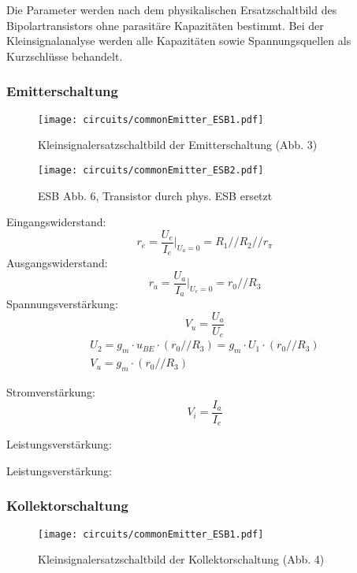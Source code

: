Die Parameter werden nach dem physikalischen Ersatzschaltbild des
Bipolartransistors ohne parasitäre Kapazitäten bestimmt. Bei der
Kleinsignalanalyse werden alle Kapazitäten sowie Spannungsquellen als
Kurzschlüsse behandelt.

\subsubsection{Emitterschaltung}

\begin{figure}[H]
  \begin{center}
    \texttt{[image: circuits/commonEmitter\_ESB1.pdf]}
  \end{center}
  \caption{Kleinsignalersatzschaltbild der Emitterschaltung (Abb. 3)}
\end{figure}

\begin{figure}[H]
  \begin{center}
    \texttt{[image: circuits/commonEmitter\_ESB2.pdf]}
  \end{center}
  \caption{ESB Abb. 6, Transistor durch phys. ESB ersetzt}
\end{figure}

\noindent Eingangswiderstand:
\[r_e = \frac{U_e}{I_e}|_{U_a = 0} = R_1 // R_2 // r_\pi\]
\noindent Ausgangswiderstand:
\[r_a = \frac{U_a}{I_a}|_{U_e = 0} = r_0 // R_3 \]
\noindent Spannungsverstärkung:
\[V_u = \frac{U_a}{U_e}\]
\begin{gather*}
  U_2 = g_m \cdot u_{BE} \cdot (r_0 // R_3) = g_m \cdot U_1 \cdot (r_0 // R_3)\\
  V_u = g_m \cdot (r_0 // R_3)
\end{gather*}

\noindent Stromverstärkung:
\[V_i = \frac{I_a}{I_e}\]
\[\]

\noindent Leistungsverstärkung:

\noindent Leistungsverstärkung:

\subsubsection{Kollektorschaltung}
\begin{figure}[H]
  \begin{center}
    \texttt{[image: circuits/commonEmitter\_ESB1.pdf]}
  \end{center}
  \caption{Kleinsignalersatzschaltbild der Kollektorschaltung (Abb. 4)}
\end{figure}


